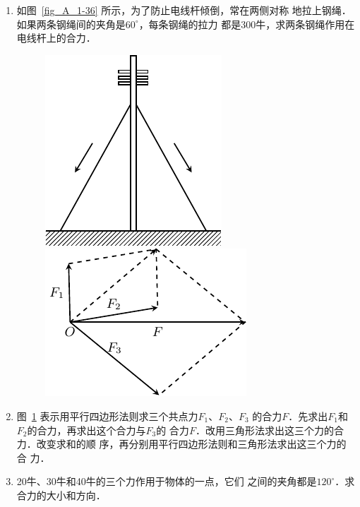 \begin{enumerate} 
\item   如图~\ref{fig_A_1-36} 所示，为了防止电线杆倾倒，常在两侧对称
地拉上钢绳．如果两条钢绳间的夹角是$60^\circ$，每条钢绳的拉力
都是300牛，求两条钢绳作用在电线杆上的合力．

\begin{figure} [htp]
\centering
\begin{minipage} [t]{0.48\textwidth} 
\centering
\includegraphics{fig/A/1-36.pdf} 
\caption{} \label{fig_A_1-36} 
\end{minipage} 
\begin{minipage} [t]{0.48\textwidth} 
\centering
\includegraphics{fig/A/1-37.pdf} 
\caption{} \label{fig_A_1-37} 
\end{minipage} 
\end{figure} 


\item  图~\ref{fig_A_1-37} 表示用平行四边形法则求三个共点力$F_1$、$F_2$、$F_3$
的合力$F$．先求出$F_1$和$F_2$的合力，再求出这个合力与$F_3$的
合力$F$．改用三角形法求出这三个力的合力．改变求和的顺
序，再分别用平行四边形法则和三角形法求出这三个力的合
力．



\item   20牛、30牛和40牛的三个力作用于物体的一点，它们
之间的夹角都是$120^\circ$．求合力的大小和方向．


\end{enumerate}
